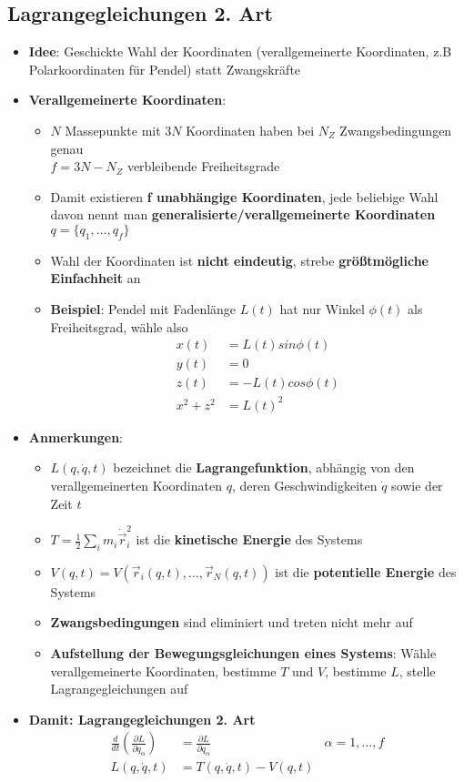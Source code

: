 \subsection{Lagrangegleichungen 2. Art}%
\label{lag:sub:lagrangegleichungen_2_art}

\begin{itemize}
	\item \textbf{Idee}: Geschickte Wahl der Koordinaten (verallgemeinerte Koordinaten, z.B Polarkoordinaten für Pendel) statt Zwangskräfte
	\item \textbf{Verallgemeinerte Koordinaten}:
	\begin{itemize}
		\item $N$ Massepunkte mit $3N$ Koordinaten haben bei $N_Z$ Zwangsbedingungen genau\\$f = 3N - N_Z$ verbleibende Freiheitsgrade
		\item Damit existieren \textbf{f unabhängige Koordinaten}, jede beliebige Wahl davon nennt man \textbf{generalisierte/verallgemeinerte Koordinaten} $q = \{q_1, \dots, q_f\}$
		\item Wahl der Koordinaten ist \textbf{nicht eindeutig}, strebe \textbf{größtmögliche Einfachheit} an
		\item \textbf{Beispiel}: Pendel mit Fadenlänge $L(t)$ hat nur Winkel $\phi(t)$ als Freiheitsgrad, wähle also
		\begin{align*}
			x(t) &= L(t)sin\phi(t)\\
			y(t) &= 0\\
			z(t) &= -L(t)cos\phi(t)\\
			x^2 + z^2 &= L(t)^2
		\end{align*}
	\end{itemize}
	\item \textbf{Anmerkungen}:
	\begin{itemize}
		\item $L(q, \dot{q}, t)$ bezeichnet die \textbf{Lagrangefunktion}, abhängig von den verallgemeinerten Koordinaten $q$, deren Geschwindigkeiten $\dot{q}$ sowie der Zeit $t$
		\item $T = \frac{1}{2}\sum_im_i\dot{\vec{r}}_i^2$ ist die \textbf{kinetische Energie} des Systems
		\item $V(q, t) = V(\vec{r}_i(q, t), \dots, \vec{r}_N(q, t))$ ist die \textbf{potentielle Energie} des Systems
		\item \textbf{Zwangsbedingungen} sind eliminiert und treten nicht mehr auf
		\item \textbf{Aufstellung der Bewegungsgleichungen eines Systems}: Wähle verallgemeinerte Koordinaten, bestimme $T$ und $V$, bestimme $L$, stelle Lagrangegleichungen auf
	\end{itemize}
	\item \textbf{Damit: Lagrangegleichungen 2. Art}
	\begin{align*}
		\frac{d}{dt}(\frac{\partial L}{\partial \dot{q}_\alpha}) &= \frac{\partial L}{\partial q_\alpha} &\alpha = 1, \dots, f\\
		L(q, \dot{q}, t) &= T(q, \dot{q}, t) - V(q, t) &
	\end{align*}
\end{itemize}

